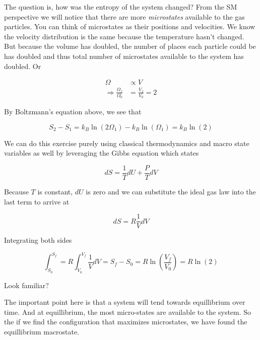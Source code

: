 \documentclass[twocolumn]{memoir} %
\begin{document}
The question is, how was the entropy of the system changed?  From the SM perspective we
will notice that there are more \emph{microstates} available to the gas particles.  You
can think of microstates as their positions and velocities.  We know the velocity distribution
is the same because the temperature hasn't changed.  But because the volume has doubled,
the number of places each particle could be has doubled and thus total number of microstates
available to the system has doubled.  Or

\begin{equation*}
\begin{split}
    \Omega & \propto V\\
    \Rightarrow \frac{\Omega_f}{\Omega_0} &= \frac{V_f}{V_0} = 2
\end{split}
\end{equation*}

By Boltzmann's equation above, we see that 

\begin{equation*}
    S_2 - S_1 = k_B \ln(2 \Omega_1) - k_B \ln (\Omega_1) = k_B \ln(2)
\end{equation*}

We can do this exercise purely using classical thermodynamics and macro state variables as well
by leveraging the Gibbs equation which states

\begin{equation*}
    dS = \frac{1}{T}dU + \frac{P}{T}dV
\end{equation*}

Because $T$ is constant, $dU$ is zero and we can substitute the ideal gas law into the last term to arrive at

\begin{equation*}
    dS = R \frac{1}{V}dV
\end{equation*}

Integrating both sides

\begin{equation*}
    \int_{S_0}^{S_f} = R \int_{V_0}^{V_f}\frac{1}{V}dV = S_f-S_0 = R \ln \left(\frac{V_f}{V_0}\right) = R \ln (2)
\end{equation*}

Look familiar?

The important point here is that a system will tend towards equillibrium over time.  And at equillibrium, the most
micro-states are available to the system.  So the if we find the configuration that maximizes microstates, we have
found the equillibrium macrostate.
\end{document}
